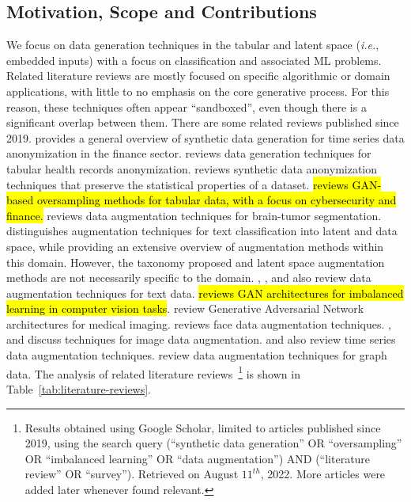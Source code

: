 \subsection{Motivation, Scope and Contributions}

We focus on data generation techniques in the tabular and latent space
(\textit{i.e.}, embedded inputs) with a focus on classification and associated
ML problems. Related literature reviews are mostly focused on specific
algorithmic or domain applications, with little to no emphasis on the core
generative process. For this reason, these techniques often appear
``sandboxed'', even though there is a significant overlap between them. There
are some related reviews published since 2019. \cite{assefa2020generating}
provides a general overview of synthetic data generation for time series data
anonymization in the finance sector. \cite{hernandez2022synthetic} reviews
data generation techniques for tabular health records anonymization.
\cite{raghunathan2021synthetic} reviews synthetic data anonymization
techniques that preserve the statistical properties of a dataset.
\cite{sauber2022use} \hl{reviews GAN-based oversampling methods for tabular
data, with a focus on cybersecurity and finance.} \cite{nalepa2019data}
reviews data augmentation techniques for brain-tumor segmentation.
\cite{bayer2021survey} distinguishes augmentation techniques for text
classification into latent and data space, while providing an extensive
overview of augmentation methods within this domain. However, the taxonomy
proposed and latent space augmentation methods are not necessarily specific to
the domain. \cite{shorten2021text}, \cite{chen2021empirical},
\cite{feng2021survey} and \cite{liu2020survey} also review data augmentation
techniques for text data. \cite{sampath2021survey}\hl{ reviews GAN
architectures for imbalanced learning in computer vision tasks}.
\cite{yi2019generative} review Generative Adversarial Network architectures
for medical imaging. \cite{wang2020survey} reviews face data augmentation
techniques. \cite{shorten2019survey}, \cite{khosla2020enhancing} and
\cite{khalifa2021comprehensive} discuss techniques for image data
augmentation.  \cite{iwana2021empirical} and \cite{wen2020time} also review
time series data augmentation techniques.  \cite{zhao2022graph} review data
augmentation techniques for graph data. The analysis of related literature
reviews~\footnote{Results obtained using Google Scholar, limited to articles
    published since 2019, using the search query {\selectfont
        (``synthetic data generation'' OR ``oversampling'' OR ``imbalanced
        learning'' OR ``data augmentation'') AND (``literature review'' OR
``survey'')}. Retrieved on August $11^{th}$, 2022. More articles were added
later whenever found relevant.  } is shown in
Table~\ref{tab:literature-reviews}.


